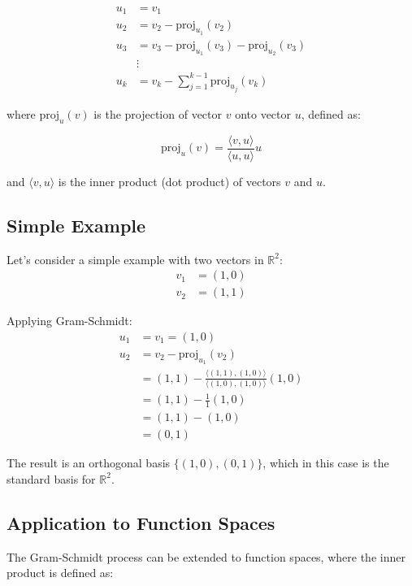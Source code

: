 \documentclass{article}
\begin{document}
\begin{align}
u_1 &= v_1 \\
u_2 &= v_2 - \text{proj}_{u_1}(v_2) \\
u_3 &= v_3 - \text{proj}_{u_1}(v_3) - \text{proj}_{u_2}(v_3) \\
&\vdots \\
u_k &= v_k - \sum_{j=1}^{k-1} \text{proj}_{u_j}(v_k)
\end{align}

where $\text{proj}_u(v)$ is the projection of vector $v$ onto vector $u$, defined as:

\begin{equation}
\text{proj}_u(v) = \frac{\langle v, u \rangle}{\langle u, u \rangle} u
\end{equation}

and $\langle v, u \rangle$ is the inner product (dot product) of vectors $v$ and $u$.

\subsection{Simple Example}

Let's consider a simple example with two vectors in $\mathbb{R}^2$:
\begin{align}
v_1 &= (1, 0) \\
v_2 &= (1, 1)
\end{align}

Applying Gram-Schmidt:
\begin{align}
u_1 &= v_1 = (1, 0) \\
u_2 &= v_2 - \text{proj}_{u_1}(v_2) \\
&= (1, 1) - \frac{\langle (1, 1), (1, 0) \rangle}{\langle (1, 0), (1, 0) \rangle} (1, 0) \\
&= (1, 1) - \frac{1}{1} (1, 0) \\
&= (1, 1) - (1, 0) \\
&= (0, 1)
\end{align}

The result is an orthogonal basis $\{(1, 0), (0, 1)\}$, which in this case is the standard basis for $\mathbb{R}^2$.

\subsection{Application to Function Spaces}

The Gram-Schmidt process can be extended to function spaces, where the inner product is defined as:
\end{document}
